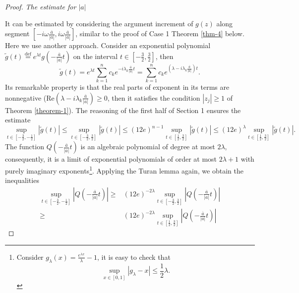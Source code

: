 \begin{proof}
  \textit{The estimate for $\left| a \right| $}

  It can be estimated by considering the argument increment of $g(z)$ along segment $\left[ -i\omega \frac{\overline{a}}{|a|},i\omega \frac{\overline{a}}{|a|} \right] $, similar to the proof of Case 1 Theorem \ref{thm-4} below. Here we use another approach. Consider an exponential polynomial $\tilde{g}(t)\overset{\mathrm{def}}{=}e^{\lambda t}g\left( - \frac{\overline{a}}{\left| a \right| }t \right) $ on the interval $t\in \left[ -\frac{3}{2},\frac{3}{2} \right] $, then
  \[
    \tilde{g}(t)=e^{\lambda t}\sum_{k=1}^{n}c_k e^{-i\lambda_k \frac{\overline{a}}{\left| a \right| }t}=\sum_{k=1}^{n}c_k e^{\left( \lambda - i\lambda_k \frac{\overline{a}}{|a|} \right)t }.
  \] 
  Its remarkable property is that the real parts of exponent in its terms are nonnegative ($\mathrm{Re} \left( \lambda - i\lambda_k \frac{\overline{a}}{|a|} \right) \ge 0$, then it satisfies the condition $\left| z_j \right| \ge 1$ of Theorem \ref{theorem-1}). The reasoning of the first half of Section 1 ensures the estimate
  \[
    \sup_{t\in \left[ -\frac{3}{2},-\frac{1}{2} \right] }\left| \tilde{g}(t) \right| \le \sup_{t\in \left[ -\frac{3}{2},\frac{3}{2} \right] }\left| \tilde{g}(t) \right| \le \left( 12e \right) ^{n-1}\sup_{t\in \left[ \frac{1}{2},\frac{3}{2} \right] }\left| \tilde{g}(t) \right| \le  \left( 12e \right) ^{\lambda}\sup_{t\in \left[ \frac{1}{2},\frac{3}{2} \right] }\left| \tilde{g}(t) \right| .
  \] 
  The function $Q\left( -\frac{\overline{a}}{\left| a \right| }t \right) $ is an algebraic polynomial of degree at most $2\lambda$, consequently, it is a limit of exponential polynomials of order at most $2\lambda+1$ with purely imaginary exponents\footnote{Consider $g_{\lambda}(x)= \frac{e^{\lambda x}}{\lambda}-1$, it is easy to check that  
 \[
   \sup_{x\in [0,1]}\left| g_{\lambda}-x \right|\le  \frac{1}{2}\lambda. 
 \] 
  }. Applying the Turan lemma again, we obtain the inequalities
  \begin{equation*}
    \begin{aligned}
      \sup_{t\in \left[ -\frac{3}{2},-\frac{1}{2} \right] }\left| Q\left( -\frac{\overline{a}}{\left| a \right| }t \right)  \right| \ge & \left( 12e \right) ^{-2\lambda}\sup_{t\in \left[ -\frac{3}{2},\frac{3}{2} \right] }\left| Q\left( - \frac{\overline{a}}{\left| a \right| }t \right)  \right|\\
      \ge & \left( 12e \right) ^{-2\lambda}\sup_{t\in \left[ \frac{1}{2},\frac{3}{2} \right] }\left| Q\left( - \frac{\overline{a}}{|a|}t \right)  \right| 
  \end{aligned}

\end{equation*}
\end{proof}
